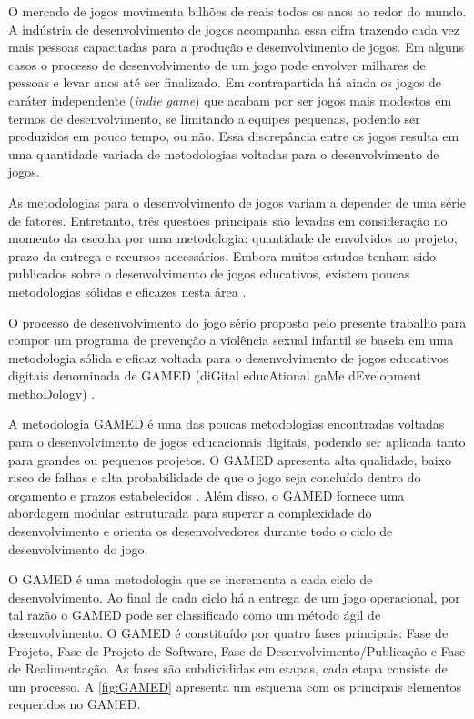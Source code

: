 O mercado de jogos movimenta bilhões de reais todos os anos ao redor do mundo. A indústria de desenvolvimento de jogos acompanha essa cifra trazendo cada vez mais pessoas capacitadas para a produção e desenvolvimento de jogos. Em alguns casos o processo de desenvolvimento de um jogo pode envolver milhares de pessoas e levar anos até ser finalizado. Em contrapartida há ainda os jogos de caráter independente (\textit{indie game}) que acabam por ser jogos mais modestos em termos de desenvolvimento, se limitando a equipes pequenas, podendo ser produzidos em pouco tempo, ou não. Essa discrepância entre os jogos resulta em uma quantidade variada de metodologias voltadas para o desenvolvimento de jogos.


As metodologias para o desenvolvimento de jogos variam a depender de uma série de fatores. Entretanto, três questões principais são levadas em consideração no momento da escolha por uma metodologia: quantidade de envolvidos no projeto, prazo da entrega e recursos necessários. Embora muitos estudos tenham sido publicados sobre o desenvolvimento de jogos educativos, existem poucas metodologias sólidas e eficazes nesta área \cite{aslan2015gamed}. 

O processo de desenvolvimento do jogo sério proposto pelo presente trabalho para compor um programa de prevenção a violência sexual infantil se baseia em uma metodologia sólida e eficaz voltada para o desenvolvimento de jogos educativos digitais denominada de GAMED (diGital educAtional gaMe dEvelopment methoDology) \cite{aslan2016digital}. 


A metodologia GAMED é uma das poucas metodologias encontradas voltadas para o desenvolvimento de jogos educacionais digitais, podendo ser aplicada tanto para grandes ou pequenos projetos. O GAMED apresenta alta qualidade, baixo risco de falhas e alta probabilidade de que o jogo seja concluído dentro do orçamento e prazos estabelecidos \cite{aslan2015gamed}. Além disso, o GAMED fornece uma abordagem modular estruturada para superar a complexidade do desenvolvimento e orienta os desenvolvedores durante todo o ciclo de desenvolvimento do jogo.


O GAMED é uma metodologia que se incrementa a cada ciclo de desenvolvimento. Ao final de cada ciclo há a entrega de um jogo operacional, por tal razão o GAMED pode ser classificado como um método ágil de desenvolvimento. O GAMED é constituído por quatro fases principais: Fase de Projeto, Fase de Projeto de Software, Fase de Desenvolvimento/Publicação e Fase de Realimentação. As fases são subdivididas em etapas, cada etapa consiste de um processo. A \autoref{fig:GAMED} apresenta um esquema com os principais elementos requeridos no GAMED. 

